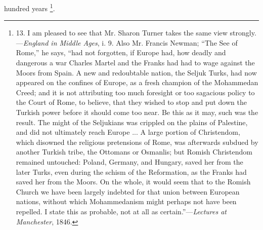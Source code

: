 hundred years \footnote{13.
I am pleased to see that Mr. Sharon Turner takes the same view
strongly.—\emph{England in Middle Ages}, i. 9. Also Mr. Francis
Newman; ``The See of Rome,'' he says, ``had not forgotten, if Europe had,
how deadly and dangerous a war Charles Martel and the Franks had had
to wage against the Moors from Spain. A new and redoubtable nation,
the Seljuk Turks, had now appeared on the confines of Europe, as a
fresh champion of the Mohammedan Creed; and it is not attributing too
much foresight or too sagacious policy to the Court of Rome, to
believe, that they wished to stop and put down the Turkish power
before it should come too near. Be this as it may, such was the
result. The might of the Seljukians was crippled on the plains of
Palestine, and did not ultimately reach Europe ... A large portion of
Christendom, which disowned the religious pretensions of Rome, was
afterwards subdued by another Turkish tribe, the Ottomans or Osmanlis;
but Romish Christendom remained untouched: Poland, Germany, and
Hungary, saved her from the later Turks, even during the schism of the
Reformation, as the Franks had saved her from the Moors. On the whole,
it would seem that to the Romish Church we have been largely indebted
for that union between European nations, without which Mohammedanism
might perhaps not have been repelled. I state this as probable, not at
all as certain.''—\emph{Lectures at Manchester}, 1846.}.



